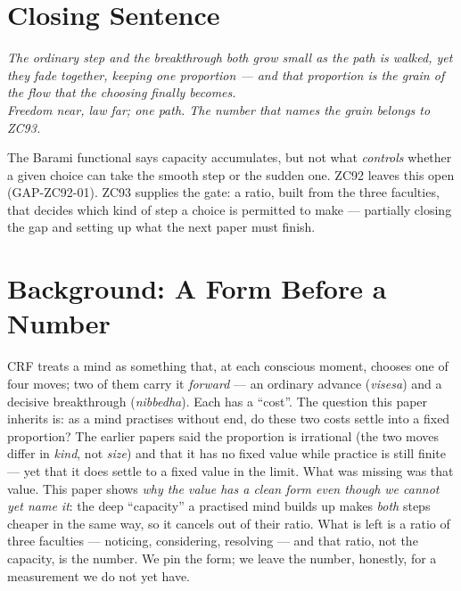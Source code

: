\documentclass[12pt, a4paper]{article}
\begin{document}
\section{Closing Sentence}

\bigskip
\begin{center}
\textit{%
  The ordinary step and the breakthrough both grow small as the path is
  walked, yet they fade together, keeping one proportion --- and that
  proportion is the grain of the flow that the choosing finally becomes.\\[0.3em]
  Freedom near, law far; one path. The number that names the grain
  belongs to ZC93.
}
\end{center}



\noindent
The Barami functional says capacity accumulates, but not what \emph{controls}
whether a given choice can take the smooth step or the sudden one. ZC92 leaves
this open (GAP-ZC92-01). ZC93 supplies the gate: a ratio, built from the three
faculties, that decides which kind of step a choice is permitted to make ---
partially closing the gap and setting up what the next paper must finish.
\section{Background: A Form Before a Number}
\label{sec:background-zc93}

\begin{keybox}[title={If you are just arriving --- ZC93 in plain language}]
\sloppy
CRF treats a mind as something that, at each conscious moment, chooses one of
four moves; two of them carry it \emph{forward} --- an ordinary advance
(\emph{visesa}) and a decisive breakthrough (\emph{nibbedha}). Each has a
``cost''. The question this paper inherits is: as a mind practises without
end, do these two costs settle into a fixed proportion? The earlier papers
said the proportion is irrational (the two moves differ in \emph{kind}, not
\emph{size}) and that it has no fixed value while practice is still finite ---
yet that it does settle to a fixed value in the limit. What was missing was
that value. This paper shows \emph{why the value has a clean form even though
we cannot yet name it}: the deep ``capacity'' a practised mind builds up makes
\emph{both} steps cheaper in the same way, so it cancels out of their ratio.
What is left is a ratio of three faculties --- noticing, considering,
resolving --- and that ratio, not the capacity, is the number. We pin the
form; we leave the number, honestly, for a measurement we do not yet have.
\end{keybox}
\end{document}
